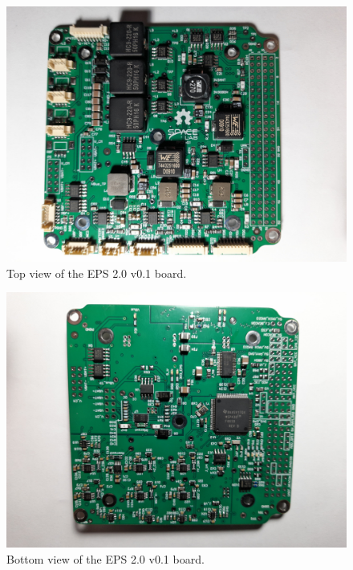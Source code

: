 \begin{figure}[!ht]
    \begin{center}
        \includegraphics[width=\columnwidth]{figures/v01/eps2-v01-top.jpg}
        \caption{Top view of the EPS 2.0 v0.1 board.}
        \label{fig:eps2-v01-top}
    \end{center}
\end{figure}

\begin{figure}[!ht]
    \begin{center}
        \includegraphics[width=\columnwidth]{figures/v01/eps2-v01-bottom.jpg}
        \caption{Bottom view of the EPS 2.0 v0.1 board.}
        \label{fig:eps2-v01-bottom}
    \end{center}
\end{figure}



